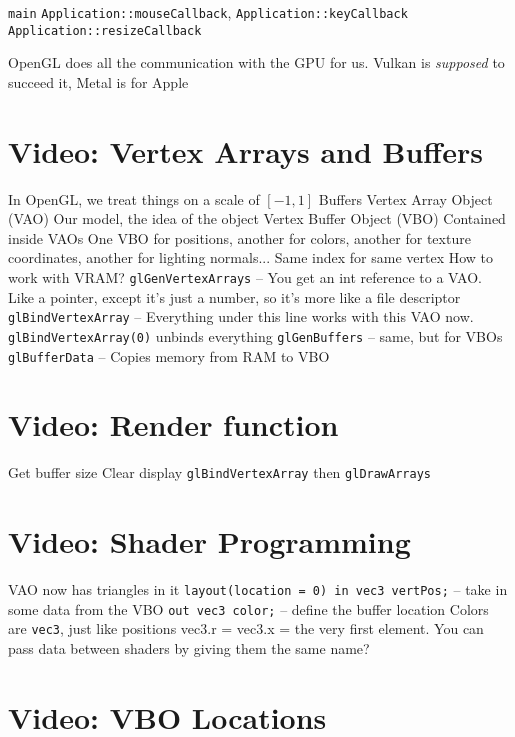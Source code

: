 \begin{outline}
    \1 \texttt{main}
    \1 \texttt{Application::mouseCallback}, \texttt{Application::keyCallback}
    \1 \texttt{Application::resizeCallback}
\end{outline}

OpenGL does all the communication with the GPU for us. Vulkan is \textit{supposed} to succeed it, Metal is for Apple

\section{Video: Vertex Arrays and Buffers}

\begin{outline}
    \1 In OpenGL, we treat things on a scale of $[-1, 1]$
    \1 Buffers
        \2 Vertex Array Object (VAO)
            \3 Our model, the idea of the object
        \2 Vertex Buffer Object (VBO)
            \2 Contained inside VAOs
            \2 One VBO for positions, another for colors, another for texture coordinates, another for lighting normals...
            \2 Same index for same vertex
    \1 How to work with VRAM?
        \2 \texttt{glGenVertexArrays} -- You get an int reference to a VAO. Like a pointer, except it's just a number, so it's more like a file descriptor
        \2  \texttt{glBindVertexArray} -- Everything under this line works with this VAO now. \texttt{glBindVertexArray(0)} unbinds everything
        \2 \texttt{glGenBuffers} -- same, but for VBOs
        \2 \texttt{glBufferData} -- Copies memory from RAM to VBO
\end{outline}

\section{Video: Render function}

\begin{outline}[enumerate]
    \1 Get buffer size
    \1 Clear display
    \1 \texttt{glBindVertexArray} then \texttt{glDrawArrays}
\end{outline}

\section{Video: Shader Programming}

\begin{outline}[]
    \1 VAO now has triangles in it
    \1 \texttt{layout(location = 0) in vec3 vertPos;} -- take in some data from the VBO
    \1 \texttt{out vec3 color;} -- define the buffer location
    \1 Colors are \texttt{vec3},  just like positions
        \2 vec3.r = vec3.x = the very first element.
    \1 You can pass data between shaders by giving them the same name?
\end{outline}

\section{Video: VBO Locations}

